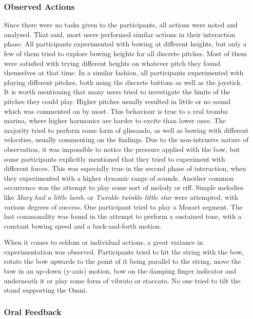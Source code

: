 \documentclass[dvipsnames, pdftex]{article}
\begin{document}
\subsubsection{Observed Actions}
Since there were no tasks given to the participants, all actions were noted and analysed. That said, most users performed similar actions in their interaction phase. All participants experimented with bowing at different heights, but only a few of them tried to explore bowing heights for all discrete pitches. Most of them were satisfied with trying different heights on whatever pitch they found themselves at that time. In a similar fashion, all participants experimented with playing different pitches, both using the discrete buttons as well as the joystick. It is worth mentioning that many users tried to investigate the limits of the pitches they could play. Higher pitches usually resulted in little or no sound which was commented on by most. This behaviour is true to a real tromba marina, where higher harmonics are harder to excite than lower ones. The majority tried to perform some form of glissando, as well as bowing with different velocities, usually commenting on the findings. Due to the non-intrusive nature of observation, it was impossible to notice the pressure applied with the bow, but some participants explicitly mentioned that they tried to experiment with different forces. This was especially true in the second phase of interaction, when they experimented with a higher dynamic range of sounds. Another common occurrence was the attempt to play some sort of melody or riff. Simple melodies like \textit{Mary had a little lamb}, or \textit{Twinkle twinkle little star} were attempted, with various degrees of success. One participant tried to play a Mozart segment. The last commonality was found in the attempt to perform a sustained tone, with a constant bowing speed and a back-and-forth motion.

When it comes to seldom or individual actions, a great variance in experimentation was observed. Participants tried to hit the string with the bow, rotate the bow upwards to the point of it being parallel to the string, move the bow in an up-down (y-axis) motion, bow on the damping finger indicator and underneath it or play some form of vibrato or staccato. No one tried to tilt the stand supporting the Omni.

\subsubsection{Oral Feedback}
\end{document}
